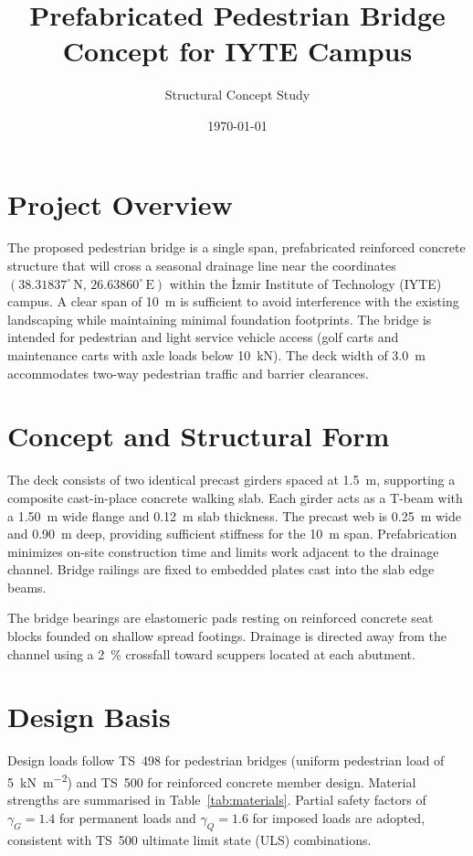 \documentclass[12pt,a4paper]{article}
\title{Prefabricated Pedestrian Bridge Concept for IYTE Campus}
\author{Structural Concept Study}
\date{\today}
\begin{document}
\maketitle

\section{Project Overview}
The proposed pedestrian bridge is a single span, prefabricated reinforced concrete structure that will cross a seasonal drainage line near the coordinates $(38.31837^{\circ}\,\mathrm{N},\,26.63860^{\circ}\,\mathrm{E})$ within the İzmir Institute of Technology (IYTE) campus. A clear span of \SI{10}{\meter} is sufficient to avoid interference with the existing landscaping while maintaining minimal foundation footprints. The bridge is intended for pedestrian and light service vehicle access (golf carts and maintenance carts with axle loads below \SI{10}{\kilo\newton}). The deck width of \SI{3.0}{\meter} accommodates two-way pedestrian traffic and barrier clearances.

\section{Concept and Structural Form}
The deck consists of two identical precast girders spaced at \SI{1.5}{\meter}, supporting a composite cast-in-place concrete walking slab. Each girder acts as a T-beam with a \SI{1.50}{\meter} wide flange and \SI{0.12}{\meter} slab thickness. The precast web is \SI{0.25}{\meter} wide and \SI{0.90}{\meter} deep, providing sufficient stiffness for the \SI{10}{\meter} span. Prefabrication minimizes on-site construction time and limits work adjacent to the drainage channel. Bridge railings are fixed to embedded plates cast into the slab edge beams.

The bridge bearings are elastomeric pads resting on reinforced concrete seat blocks founded on shallow spread footings. Drainage is directed away from the channel using a \SI{2}{\percent} crossfall toward scuppers located at each abutment.

\section{Design Basis}
Design loads follow TS~498 for pedestrian bridges (uniform pedestrian load of \SI{5}{\kilo\newton\per\square\meter}) and TS~500 for reinforced concrete member design. Material strengths are summarised in Table~\ref{tab:materials}. Partial safety factors of $\gamma_G = 1.4$ for permanent loads and $\gamma_Q = 1.6$ for imposed loads are adopted, consistent with TS~500 ultimate limit state (ULS) combinations.
\end{document}
